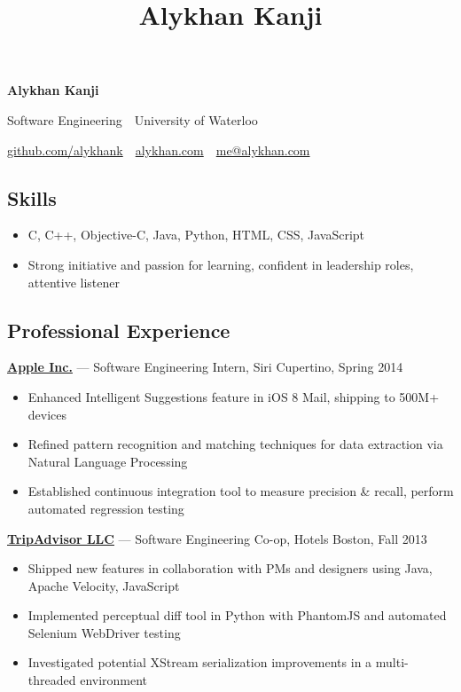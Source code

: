 \documentclass[11pt,letterpaper]{article}
\title{Alykhan Kanji}
\begin{document}
\begin{center}
{\Huge \textbf{Alykhan Kanji}}

{\large
Software Engineering\ \textperiodcentered \ University of Waterloo

\href{https://github.com/alykhank}{github.com/alykhank}\ \textperiodcentered \ \href{http://alykhan.com}{alykhan.com}\ \textperiodcentered \ \href{mailto:me@alykhan.com}{me@alykhan.com}
}
\end{center}

\subsection*{Skills}
\begin{itemize}[before=,after=]
\item C, C++, Objective-C, Java, Python, HTML, CSS, JavaScript
\item Strong initiative and passion for learning, confident in leadership roles, attentive listener
\end{itemize}

\subsection*{Professional Experience}
\noindent
\href{http://apple.com}{\textbf{Apple Inc.}} --- Software Engineering Intern, Siri \hfill {\color{gray} Cupertino, Spring 2014}
\begin{itemize}
\item Enhanced Intelligent Suggestions feature in iOS 8 Mail, shipping to 500M+ devices
\item Refined pattern recognition and matching techniques for data extraction via Natural Language Processing
\item Established continuous integration tool to measure precision \& recall, perform automated regression testing
\end{itemize}

\noindent
\href{http://tripadvisor.com}{\textbf{TripAdvisor LLC}} --- Software Engineering Co-op, Hotels \hfill {\color{gray} Boston, Fall 2013}
\begin{itemize}
\item Shipped new features in collaboration with PMs and designers using Java, Apache Velocity, JavaScript
\item Implemented perceptual diff tool in Python with PhantomJS and automated Selenium WebDriver testing
\item Investigated potential XStream serialization improvements in a multi-threaded environment
\end{itemize}
\end{document}
